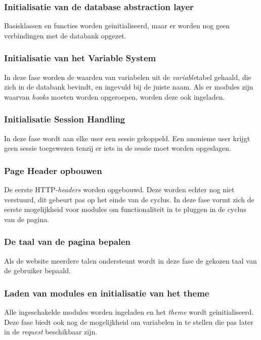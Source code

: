 \subsubsection{Initialisatie van de database abstraction layer}
Basisklassen en functies worden ge\"{i}nitialiseerd, maar er worden nog geen verbindingen met de databank opgezet.

\subsubsection{Initialisatie van het Variable System}
In deze fase worden de waarden van variabelen uit de \textit{variable}tabel gehaald, die zich in de databank bevindt, en ingevuld bij de juiste naam. Als er modules zijn waarvan \textit{hooks} moeten worden opgeroepen, worden deze ook ingeladen.

\subsubsection{Initialisatie Session Handling}
In deze fase wordt aan elke user een sessie gekoppeld. Een anonieme user krijgt geen sessie toegewezen tenzij er iets in de sessie moet worden opgeslagen.

\subsubsection{Page Header opbouwen}
De eerste HTTP-\textit{headers} worden opgebouwd. Deze worden echter nog niet verstuurd, dit gebeurt pas op het einde van de cyclus. In deze fase vormt zich de eerste mogelijkheid voor modules om functionaliteit in te pluggen in de cyclus van de pagina.

\subsubsection{De taal van de pagina bepalen}
Als de website meerdere talen ondersteunt wordt in deze fase de gekozen taal van de gebruiker bepaald.

\subsubsection{Laden van modules en initialisatie van het theme}
Alle ingeschakelde modules worden ingeladen en het \textit{theme} wordt ge\"{i}nitialiseerd. Deze fase biedt ook nog de mogelijkheid om variabelen in te stellen die pas later in de \textit{request} beschikbaar zijn.

